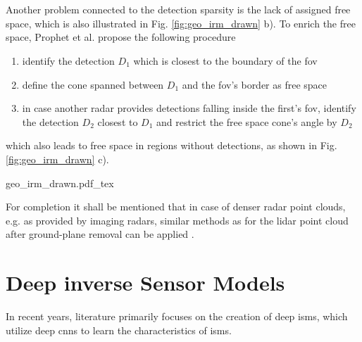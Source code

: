 \\\\
Another problem connected to the detection sparsity is the lack of assigned free space, which is also illustrated in Fig. \ref{fig:geo_irm_drawn} b). To enrich the free space, Prophet et al. \cite{prophet2018adaptions} propose the following procedure
\begin{enumerate}[noitemsep,nolistsep,topsep=0pt]
	\item identify the detection $D_1$ which is closest to the boundary of the \gls{fov}
	\item define the cone spanned between $D_1$ and the \gls{fov}'s border as free space
	\item in case another radar provides detections falling inside the first's \gls{fov}, identify the detection $D_2$ closest to $D_1$ and restrict the free space cone's angle by $D_2$   
\end{enumerate}
which also leads to free space in regions without detections, as shown in Fig. \ref{fig:geo_irm_drawn} c).
\begin{center}
	{geo_irm_drawn.pdf_tex}
\end{center}
For completion it shall be mentioned that in case of denser radar point clouds, e.g. as provided by imaging radars, similar methods as for the lidar point cloud after ground-plane removal can be applied \cite{slutsky2019dual}.
%
\section{Deep inverse Sensor Models}
\label{sec:deep_isms}
In recent years, literature primarily focuses on the creation of deep \gls{ism}s, which utilize deep \gls{cnn}s to learn the characteristics of \gls{ism}s. 
%
